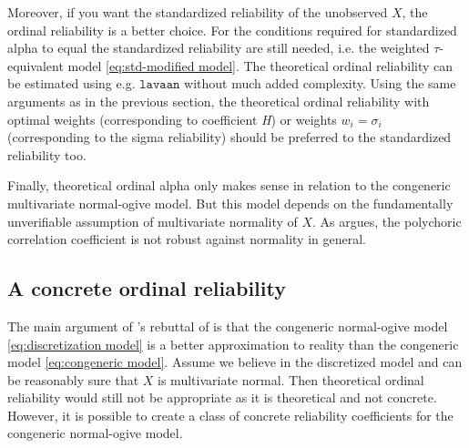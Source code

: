 \documentclass[twoside]{article}
\begin{document}
Moreover, if you want the standardized reliability of the unobserved
$X$, the ordinal reliability is a better choice. For the conditions
required for standardized alpha to equal the standardized reliability
are still needed, i.e. the weighted $\tau$-equivalent model \eqref{eq:std-modified model}. The
theoretical ordinal reliability can be estimated using e.g. $\mathtt{lavaan}$
without much added complexity. Using the same arguments as in the
previous section, the theoretical ordinal reliability with optimal
weights (corresponding to coefficient \textit{H}) or weights $w_{i}=\sigma_{i}$
(corresponding to the sigma reliability) should be preferred to the
standardized reliability too.

Finally, theoretical ordinal alpha only makes sense in relation to
the congeneric multivariate normal-ogive model. But this model depends on
the fundamentally unverifiable assumption of multivariate normality
of $X$. As \citet{Foldnes2019-yd} argues, the polychoric correlation coefficient is not robust against normality in general.

\subsection{A concrete ordinal reliability}

The main argument of \citet{Zumbo2019-lm}'s rebuttal of \citet{Chalmers2018-fj}
is that the congeneric normal-ogive model \eqref{eq:discretization model} 
is a better approximation to reality than the congeneric model \eqref{eq:congeneric model}.
Assume we believe in the discretized model and can be reasonably
sure that $X$ is multivariate normal. Then theoretical ordinal reliability would still
not be appropriate as it is theoretical and not concrete. However,
it is possible to create a class of concrete reliability coefficients for the
congeneric normal-ogive model.
\end{document}

